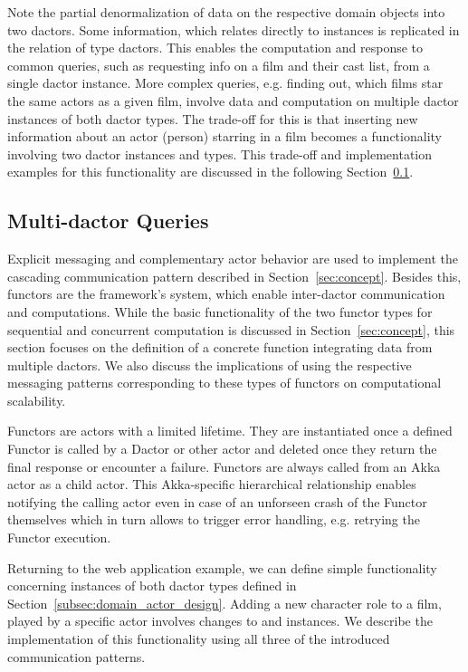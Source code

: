 Note the partial denormalization of data on the respective domain objects into two \glspl{dactor}.
Some information, which relates directly to  instances is replicated in the  \gls{relation} of  type \glspl{dactor}.
This enables the computation and response to common queries, such as requesting info on a film and their cast list, from a single \gls{dactor} instance.
More complex queries, e.g. finding out, which films star the same actors as a given film, involve data and computation on multiple \gls{dactor} instances of both \gls{dactor} types.
The trade-off for this is that inserting new information about an actor (person) starring in a film becomes a functionality involving two \gls{dactor} instances and types.
This trade-off and implementation examples for this functionality are discussed in the following Section~\ref{subsec:multi_dactor_queries}.


\subsection[Multi-Dactor Queries]{Multi-\Gls{dactor} Queries}\label{subsec:multi_dactor_queries}

Explicit messaging and complementary actor behavior are used to implement the cascading communication pattern described in Section~\ref{sec:concept}.
Besides this, \glspl{functor} are the framework's system, which enable inter-\gls{dactor} communication and computations.
While the basic functionality of the two \gls{functor} types for sequential and concurrent computation is discussed in Section~\ref{sec:concept}, this section focuses on the definition of a concrete function integrating data from multiple \glspl{dactor}.
We also discuss the implications of using the respective messaging patterns corresponding to these types of \glspl{functor} on computational scalability.

Functors are actors with a limited lifetime.
They are instantiated once a defined Functor is called by a Dactor or other actor and deleted once they return the final response or encounter a failure.
Functors are always called from an Akka actor as a child actor.
This Akka-specific hierarchical relationship enables notifying the calling actor even in case of an unforseen crash of the Functor themselves which in turn allows to trigger error handling, e.g. retrying the Functor execution.

Returning to the web application example, we can define simple functionality concerning instances of both \gls{dactor} types defined in Section~\ref{subsec:domain_actor_design}.
Adding a new character role to a film, played by a specific actor involves changes to  and  instances.
We describe the implementation of this functionality using all three of the introduced communication patterns.

